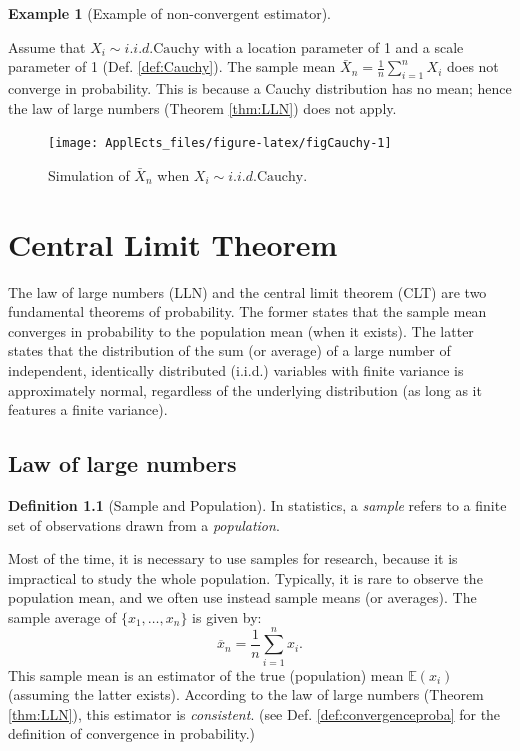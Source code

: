 \documentclass[
  12pt,
]{book}
\theoremstyle{definition}
\newtheorem{definition}{Definition}[chapter]
\theoremstyle{definition}
\newtheorem{example}{Example}[chapter]
\theoremstyle{definition}
\theoremstyle{definition}
\theoremstyle{remark}
\begin{document}
\begin{example}[Example of non-convergent estimator]
\protect\hypertarget{exm:NonConsist}{}\label{exm:NonConsist}

Assume that \(X_i \sim i.i.d. \mbox{Cauchy}\) with a location parameter of 1 and a scale parameter of 1 (Def. \ref{def:Cauchy}). The sample mean \(\bar{X}_n = \frac{1}{n}\sum_{i=1}^{n} X_i\) does not converge in probability. This is because a Cauchy distribution has no mean; hence the law of large numbers (Theorem \ref{thm:LLN}) does not apply.

\begin{figure}
\texttt{[image: ApplEcts\_files/figure-latex/figCauchy-1]} \caption{Simulation of $\bar{X}_n$ when $X_i \sim i.i.d. \mbox{Cauchy}$.}\label{fig:figCauchy}
\end{figure}

\end{example}

\hypertarget{TCL}{%
\chapter{Central Limit Theorem}\label{TCL}}

The law of large numbers (LLN) and the central limit theorem (CLT) are two fundamental theorems of probability. The former states that the sample mean converges in probability to the population mean (when it exists). The latter states that the distribution of the sum (or average) of a large number of independent, identically distributed (i.i.d.) variables with finite variance is approximately normal, regardless of the underlying distribution (as long as it features a finite variance).

\hypertarget{law-of-large-numbers}{%
\section{Law of large numbers}\label{law-of-large-numbers}}

\begin{definition}[Sample and Population]
\protect\hypertarget{def:smplpop}{}\label{def:smplpop}In statistics, a \emph{sample} refers to a finite set of observations drawn from a \emph{population}.
\end{definition}

Most of the time, it is necessary to use samples for research, because it is impractical to study the whole population. Typically, it is rare to observe the population mean, and we often use instead sample means (or averages). The sample average of \(\{x_1,\dots,x_n\}\) is given by:
\[
\overline{x}_n = \frac{1}{n}\sum_{i=1}^n x_i.
\]
This sample mean is an estimator of the true (population) mean \(\mathbb{E}(x_i)\) (assuming the latter exists). According to the law of large numbers (Theorem \ref{thm:LLN}), this estimator is \emph{consistent}. (see Def. \ref{def:convergenceproba} for the definition of convergence in probability.)
\end{document}
